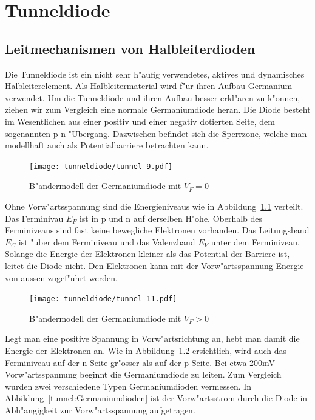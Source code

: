 
\chapter{Tunneldiode\label{chapter:tunneldiode}}
\begin{refsection}

\section{Leitmechanismen von Halbleiterdioden}

Die Tunneldiode ist ein nicht sehr h"aufig verwendetes, aktives und dynamisches Halbleiterelement.
Als Halbleitermaterial wird f"ur ihren  Aufbau Germanium verwendet. 
Um die Tunneldiode und ihren Aufbau besser erkl"aren zu k"onnen, ziehen wir zum Vergleich eine normale Germaniumdiode heran. 
Die Diode besteht im Wesentlichen aus einer positiv und einer negativ dotierten Seite, dem sogenannten p-n-"Ubergang. 
Dazwischen befindet sich die Sperrzone, welche man modellhaft auch als Potentialbarriere betrachten kann.

\begin{figure}	%
\centering
\texttt{[image: tunneldiode/tunnel-9.pdf]}
\caption{B"andermodell der Germaniumdiode mit $V_F = 0$
\label{tunnel:BaendermodellG0}}
\end{figure}

Ohne Vorw"artsspannung sind die Energieniveaus wie in Abbildung~\ref{tunnel:BaendermodellG0} verteilt. 
Das Ferminivau $E_F$ ist in p und n auf derselben H"ohe.
Oberhalb des Ferminiveaus sind fast keine bewegliche Elektronen vorhanden.
Das Leitungsband $E_C$ ist "uber dem Ferminiveau  und das Valenzband $E_V$ unter dem Ferminiveau. 
Solange die Energie der Elektronen kleiner als das Potential der Barriere ist, leitet die Diode nicht.
Den Elektronen kann mit der Vorw"artsspannung Energie von aussen zugef"uhrt werden.

\begin{figure}	%
\centering
\texttt{[image: tunneldiode/tunnel-11.pdf]}
\caption{B"andermodell der Germaniumdiode mit $V_F > 0$
\label{tunnel:BaendermodellG}}
\end{figure}

Legt man eine positive Spannung in Vorw"artsrichtung an, hebt man damit die Energie der Elektronen an. 
Wie in Abbildung~\ref{tunnel:BaendermodellG} ersichtlich, wird auch das Ferminiveau auf der n-Seite gr"osser als auf der p-Seite. 
Bei etwa 200mV Vorw"artsspannung beginnt die Germaniumdiode zu leiten. 
Zum Vergleich wurden zwei verschiedene Typen Germaniumdioden vermessen. 
In Abbildung~\ref{tunnel:Germaniumdioden} ist der Vorw"artsstrom durch die Diode in Abh"angigkeit zur Vorw"artsspannung aufgetragen.


\end{refsection}
